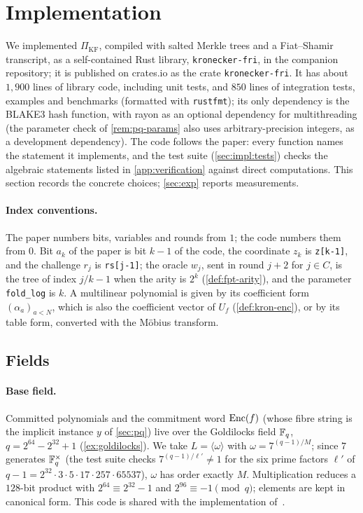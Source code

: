 \section{Implementation}\label{sec:impl}

We implemented $\Pi_{\mathrm{KF}}$, compiled with salted Merkle trees and a Fiat--Shamir transcript, as a self-contained Rust library, \texttt{kronecker-fri}, in the companion repository; it is published on crates.io as the crate \texttt{kronecker-fri}.
It has about $1{,}900$ lines of library code, including unit tests, and $850$ lines of integration tests, examples and benchmarks (formatted with \texttt{rustfmt}); its only dependency is the BLAKE3 hash function, with rayon as an optional dependency for multithreading (the parameter check of \cref{rem:pq-params} also uses arbitrary-precision integers, as a development dependency).
The code follows the paper: every function names the statement it implements, and the test suite (\cref{sec:impl:tests}) checks the algebraic statements listed in \cref{app:verification} against direct computations.
This section records the concrete choices; \cref{sec:exp} reports measurements.

\paragraph{Index conventions.}
The paper numbers bits, variables and rounds from $1$; the code numbers them from $0$.
Bit $a_k$ of the paper is bit $k-1$ of the code, the coordinate $z_k$ is \texttt{z[k-1]}, and the challenge $r_j$ is \texttt{rs[j-1]}; the oracle $w_j$, sent in round $j+2$ for $j \in C$, is the tree of index $j/k - 1$ when the arity is $2^k$ (\cref{def:fpt-arity}), and the parameter \texttt{fold\_log} is $k$.
A multilinear polynomial is given by its coefficient form $(\alpha_a)_{a < N}$, which is also the coefficient vector of $U_f$ (\cref{def:kron-enc}), or by its table form, converted with the M\"obius transform.

\subsection{Fields}\label{sec:impl:fields}

\paragraph{Base field.}
Committed polynomials and the commitment word $\mathrm{Enc}(f)$ (whose fibre string is the implicit instance $y$ of \cref{sec:pq}) live over the Goldilocks field $\mathbb{F}_q$, $q = 2^{64} - 2^{32} + 1$ (\cref{ex:goldilocks}).
We take $L = \langle \omega \rangle$ with $\omega = 7^{(q-1)/M}$; since $7$ generates $\mathbb{F}_q^\times$ (the test suite checks $7^{(q-1)/\ell'} \ne 1$ for the six prime factors $\ell'$ of $q - 1 = 2^{32} \cdot 3 \cdot 5 \cdot 17 \cdot 257 \cdot 65537$), $\omega$ has order exactly $M$.
Multiplication reduces a $128$-bit product with $2^{64} \equiv 2^{32} - 1$ and $2^{96} \equiv -1 \pmod q$; elements are kept in canonical form.
This code is shared with the implementation of~\cite{Mkh26}.

